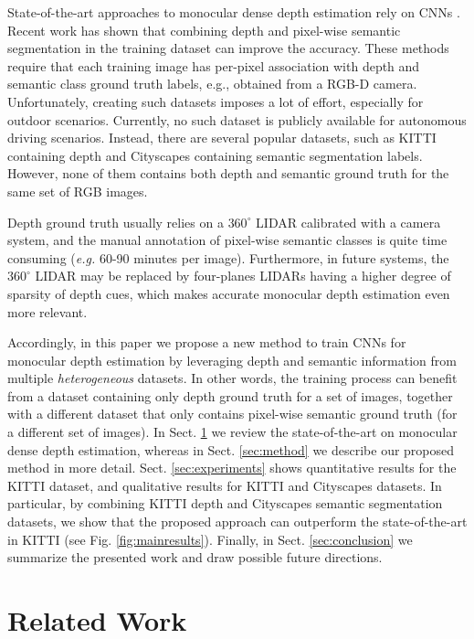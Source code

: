 \documentclass[letterpaper, 10 pt, conference]{ieeeconf}
\newcommand{\eg}{{\em e.g.}}
\newcommand{\Fig}[1]{Fig. \ref{fig:#1}}
\newcommand{\Sect}[1]{Sect. \ref{sec:#1}}
\begin{document}
State-of-the-art approaches to monocular dense depth estimation rely on CNNs \cite{Cao:2017, Fu:2017, Godard:2017, Kuznietsov:2017}. Recent work has shown \cite{Mousavian:2016, Jafari:2017} that combining depth and pixel-wise semantic segmentation in the training dataset can improve the accuracy. These methods require that each training image has per-pixel association with depth and semantic class ground truth labels, e.g., obtained from a RGB-D camera. Unfortunately, creating such datasets imposes a lot of effort, especially for outdoor scenarios. Currently, no such dataset is publicly available for autonomous driving scenarios. Instead, there are several popular datasets, such as KITTI containing depth \cite{Geiger:2013} and Cityscapes \cite{Cordts:2016} containing semantic segmentation labels. However, none of them contains both depth and semantic ground truth for the same set of RGB images. 




Depth ground truth usually relies on a $360^\circ$ LIDAR calibrated with a camera system, and the manual annotation of pixel-wise semantic classes is quite time consuming ({\eg} 60-90 minutes per image). Furthermore, in future systems, the $360^\circ$ LIDAR may be replaced by four-planes LIDARs having a higher degree of sparsity of depth cues, which makes accurate monocular depth estimation even more relevant.

Accordingly, in this paper we propose a new method to train CNNs for monocular depth estimation by leveraging depth and semantic information from multiple \emph{heterogeneous} datasets. In other words, the training process can benefit from a dataset containing only depth ground truth for a set of images, together with a different dataset that only contains pixel-wise semantic ground truth (for a different set of images). In \Sect{relatedwork} we review the state-of-the-art on monocular dense depth estimation, whereas in \Sect{method} we describe our proposed method in more detail. \Sect{experiments} shows quantitative results for the KITTI dataset, and qualitative results for KITTI and Cityscapes datasets. In particular, by combining KITTI depth and Cityscapes semantic segmentation datasets, we show that the proposed approach can outperform the state-of-the-art in KITTI (see \Fig{mainresults}). Finally, in \Sect{conclusion} we summarize the presented work and draw possible future directions.
 
\section{Related Work}
\label{sec:relatedwork}
\end{document}
